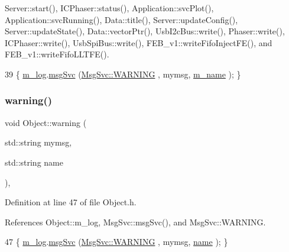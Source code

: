 Server\+::start(), I\+C\+Phaser\+::status(), Application\+::svc\+Plot(), Application\+::svc\+Running(), Data\+::title(), Server\+::update\+Config(), Server\+::update\+State(), Data\+::vector\+Ptr(), Usb\+I2c\+Bus\+::write(), Phaser\+::write(), I\+C\+Phaser\+::write(), Usb\+Spi\+Bus\+::write(), F\+E\+B\+\_\+v1\+::write\+Fifo\+Inject\+F\+E(), and F\+E\+B\+\_\+v1\+::write\+Fifo\+L\+L\+T\+F\+E().


\begin{DoxyCode}
39 \{ \hyperlink{classObject_a0d269813dd7ac1f24bc143031e2963f2}{m\_log}.\hyperlink{classMsgSvc_ad25f18047920cc59a314e5098259711c}{msgSvc} (\hyperlink{classMsgSvc_ae671eb7301996cd049d2da8a65925926a7cefae88f2ba26b2b05b676a383c834b}{MsgSvc::WARNING} , mymsg, \hyperlink{classObject_a8b83c95c705d2c3ba0d081fe1710f48d}{m\_name} ); \}
\end{DoxyCode}
\mbox{\label{classObject_a11f101db4dd73d9391b0231818881d86}} 
\subsubsection{\texorpdfstring{warning()}{warning()}\hspace{0.1cm}{\footnotesize\ttfamily [2/2]}}
{\footnotesize\ttfamily void Object\+::warning (\begin{DoxyParamCaption}\item[{std\+::string}]{mymsg,  }\item[{std\+::string}]{name }\end{DoxyParamCaption})\hspace{0.3cm}{\ttfamily [inline]}, {\ttfamily [inherited]}}



Definition at line 47 of file Object.\+h.



References Object\+::m\+\_\+log, Msg\+Svc\+::msg\+Svc(), and Msg\+Svc\+::\+W\+A\+R\+N\+I\+NG.


\begin{DoxyCode}
47 \{ \hyperlink{classObject_a0d269813dd7ac1f24bc143031e2963f2}{m\_log}.\hyperlink{classMsgSvc_ad25f18047920cc59a314e5098259711c}{msgSvc} (\hyperlink{classMsgSvc_ae671eb7301996cd049d2da8a65925926a7cefae88f2ba26b2b05b676a383c834b}{MsgSvc::WARNING} , mymsg, \hyperlink{classObject_a300f4c05dd468c7bb8b3c968868443c1}{name} ); \}
\end{DoxyCode}


